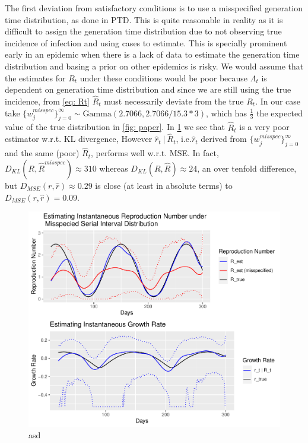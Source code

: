 \documentclass[12pt]{article}
\begin{document}
      The first deviation from satisfactory conditions is to use a misspecified generation time distribution, as done in PTD. This is quite reasonable in reality as it is
      difficult to assign the generation time distribution due to not observing true incidence of infection and using cases to estimate. 
      This is specially prominent early in an epidemic when there is a lack of data to estimate the generation time distribution and basing a prior on other epidemics is risky. 
      We would assume that the estimates for $R_t$ under these conditions would be poor because $\Lambda_t$ is dependent on generation time distribution and since we are still
      using the true incidence, from \cref{eq: Rt} $\hat{R}_t$ must necessarily deviate from the true $R_t$. 
      In our case take $\{w_j^{misspec}\}_{j=0}^\infty \sim \text{Gamma}(2.7066, 2.7066 / 15.3 * 3)$, which has $\frac{1}{3}$ the expected value of the true distribution in \cref{fig: paper}. 
      In \cref{fig: misspec} we see that $\hat{R}_t$ is a very poor estimator w.r.t. KL divergence,
      However $\hat{r}_t \ |\ \hat{R}_t$, i.e.$\hat{r}_t$ derived from $\{w_j^{misspec}\}_{j=0}^\infty$ and the same (poor) $\hat{R}_t$, performs well w.r.t. MSE. 
      In fact, $D_{KL}(R, \hat{R}^{misspec}) \approx 310$ whereas $D_{KL}(R, \hat{R}) \approx 24$, an over tenfold difference, but $D_{MSE}(r, \hat{r}) \approx 0.29$ is close 
      (at least in absolute terms) to $D_{MSE}(r, \hat{r}) = 0.09$. 

      \begin{figure}[h]
        \includegraphics[width = \linewidth]{epi_misspec.pdf}
        \caption{asd}
        \label{fig: misspec}
      \end{figure}
\end{document}
